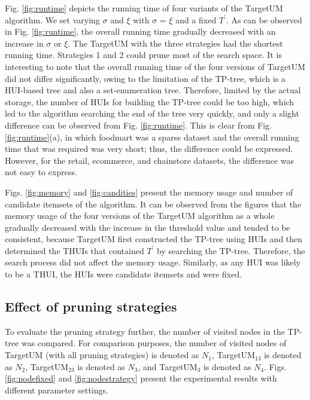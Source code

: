 \documentclass[journal]{IEEEtran}
\begin{document}
Fig. \ref{fig:runtime} depicts the running time of four variants of the TargetUM algorithm. We set varying $\sigma$ and $\xi$ with $\sigma$ = $\xi$ and a fixed $T^\prime$. As can be observed in Fig. \ref{fig:runtime}, the overall running time gradually decreased with an increase in $\sigma$ or $\xi$. The TargetUM with the three strategies had the shortest running time. Strategies 1 and 2 could prune most of the search space. It is interesting to note that the overall running time of the four versions of TargetUM did not differ significantly, owing to the limitation of the TP-tree, which is a HUI-based tree and also a set-enumeration tree. Therefore, limited by the actual storage, the number of HUIs for building the TP-tree could be too high, which led to the algorithm searching the end of the tree very quickly, and only a slight difference can be observed from Fig. \ref{fig:runtime}. This is clear from Fig. \ref{fig:runtime}(a), in which foodmart was a sparse dataset and the overall running time that was required was very short; thus, the difference could be expressed. However, for the retail, ecommerce, and chainstore datasets, the difference was not easy to express.

Figs. \ref{fig:memory} and \ref{fig:candities} present the memory usage and number of candidate itemsets of the algorithm. It can be observed from the figures that the memory usage of the four versions of the TargetUM algorithm as a whole gradually decreased with the increase in the threshold value and tended to be consistent, because TargetUM first constructed the TP-tree using HUIs and then determined the THUIs that contained $T^\prime$ by searching the TP-tree. Therefore, the search process did not affect the memory usage. Similarly, as any HUI was likely to be a THUI, the HUIs were candidate itemsets and were fixed.

\subsection{Effect of pruning strategies}

To evaluate the pruning strategy further, the number of visited nodes in the TP-tree was compared. For comparison purposes, the number of visited nodes of TargetUM (with all pruning strategies) is denoted as $N_1$, TargetUM$_{13}$ is denoted as $N_2$, TargetUM$_{23}$ is denoted as $N_3$, and TargetUM$_3$ is denoted as $N_4$. Figs. \ref{fig:nodefixed} and \ref{fig:nodestrategy} present the experimental results with different parameter settings.
\end{document}
